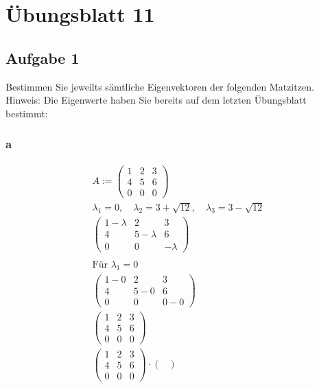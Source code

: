 \chapter{Übungsblatt 11}

\section{Aufgabe 1}
Bestimmen Sie jeweilts sämtliche Eigenvektoren der folgenden Matzitzen. Hinweis: Die Eigenwerte haben Sie bereits auf dem letzten Übungsblatt bestimmt:

\subsection{a}

\begin{align*}
    A := \begin{pmatrix}
        1 & 2 & 3 \\
        4 & 5 & 6 \\ 
        0 & 0 & 0
    \end{pmatrix} \\
    \lambda_1 = 0, \quad \lambda_2 = 3 + \sqrt{12}, \quad \lambda_3 = 3 - \sqrt{12} \\
    \begin{pmatrix}
        1 - \lambda & 2 & 3 \\
        4 & 5 - \lambda & 6 \\
        0 & 0 & -\lambda
    \end{pmatrix} \\\\
    \text{Für } \lambda_1 = 0 \\
    \begin{pmatrix}
        1 - 0 & 2 & 3 \\
        4 & 5 - 0 & 6 \\
        0 & 0 & 0 - 0
    \end{pmatrix} \\
    \begin{pmatrix}
        1 & 2 & 3 \\
        4 & 5 & 6 \\
        0 & 0 & 0
    \end{pmatrix} \\
        \begin{pmatrix}
        1 & 2 & 3 \\
        4 & 5 & 6 \\
        0 & 0 & 0
    \end{pmatrix} \cdot \begin{pmatrix}

\end{pmatrix}
\end{align*}
